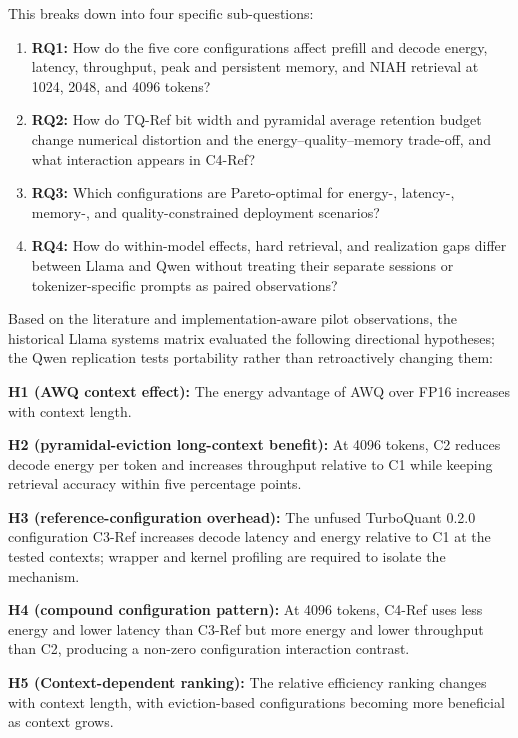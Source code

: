 \documentclass[conference]{IEEEtran}
\begin{document}
This breaks down into four specific sub-questions:

\begin{enumerate}
\item \textbf{RQ1:} How do the five core configurations affect prefill and decode energy, latency, throughput, peak and persistent memory, and NIAH retrieval at 1024, 2048, and 4096 tokens?

\item \textbf{RQ2:} How do TQ-Ref bit width and pyramidal average retention budget change numerical distortion and the energy--quality--memory trade-off, and what interaction appears in C4-Ref?

\item \textbf{RQ3:} Which configurations are Pareto-optimal for energy-, latency-, memory-, and quality-constrained deployment scenarios?
\item \textbf{RQ4:} How do within-model effects, hard retrieval, and realization gaps differ between Llama and Qwen without treating their separate sessions or tokenizer-specific prompts as paired observations?
\end{enumerate}

Based on the literature and implementation-aware pilot observations, the historical Llama systems matrix evaluated the following directional hypotheses; the Qwen replication tests portability rather than retroactively changing them:

\textbf{H1 (AWQ context effect):} The energy advantage of AWQ over FP16 increases with context length.

\textbf{H2 (pyramidal-eviction long-context benefit):} At 4096 tokens, C2 reduces decode energy per token and increases throughput relative to C1 while keeping retrieval accuracy within five percentage points.

\textbf{H3 (reference-configuration overhead):} The unfused TurboQuant 0.2.0 configuration C3-Ref increases decode latency and energy relative to C1 at the tested contexts; wrapper and kernel profiling are required to isolate the mechanism.

\textbf{H4 (compound configuration pattern):} At 4096 tokens, C4-Ref uses less energy and lower latency than C3-Ref but more energy and lower throughput than C2, producing a non-zero configuration interaction contrast.

\textbf{H5 (Context-dependent ranking):} The relative efficiency ranking changes with context length, with eviction-based configurations becoming more beneficial as context grows.
\end{document}
